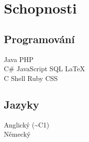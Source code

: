 \documentclass[]{deedy-resume-openfont}
\begin{document}
\begin{minipage}[t]{0.8\textwidth}

\section{Schopnosti}
\subsection{Programování}
Java \textbullet{} PHP \\
C\# \textbullet{} JavaScript \textbullet{} SQL \textbullet{} \LaTeX \\
C \textbullet{} Shell \textbullet{} Ruby \textbullet{} CSS
\sectionsep

\subsection{Jazyky}
Anglický (\textasciitilde  C1) \\
Německý
\sectionsep

\end{minipage}
\end{document}
